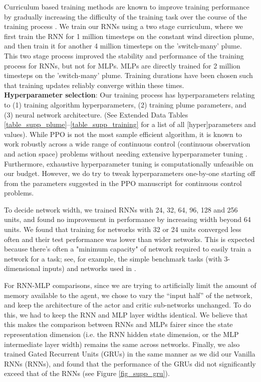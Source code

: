 \documentclass[5p,twocolumn,authoryear]{elsarticle}
\begin{document}
Curriculum based training methods are known to improve training performance by gradually increasing the difficulty of the training task over the course of the training process \citep{bengio2009curriculum}.
We train our RNNs using a two stage curriculum, where we first train the RNN for 1 million timesteps on the constant wind direction plume, and then train it for another 4 million timesteps on the 'switch-many' plume.
This two stage process improved the stability and performance of the training process for RNNs, but not for MLPs.
MLPs are directly trained for 2 million timesteps on the 'switch-many' plume. 
Training durations have been chosen such that training updates reliably converge within these times. \\

\textbf{Hyperparameter selection}:
Our training process has hyperparameters relating to (1) training algorithm hyperparameters, (2) training plume parameters, and (3) neural network architecture. 
(See Extended Data Tables \ref{table_supp_plume}--\ref{table_supp_training} for a list of all [hyper]parameters and values).
While PPO is not the most sample efficient algorithm, it is known to work robustly across a wide range of continuous control (continuous observation and action space) problems without needing extensive hyperparameter tuning \citep{schulman2017proximal,ni2021recurrent}.
Furthermore, exhaustive hyperparameter tuning is computationally unfeasible on our budget.
However, we do try to tweak hyperparameters one-by-one starting off from the parameters suggested in the PPO manuscript for continuous control problems.

To decide network width, we trained RNNs with 24, 32, 64, 96, 128 and 256 units, and found no improvement in performance by increasing width beyond 64 units. We found that training for networks with 32 or 24 units converged less often and their test performance was lower than wider networks. This is expected because there's often a "minimum capacity" of network required to easily train a network for a task; see, for example, the simple benchmark tasks (with 3-dimensional inputs) and networks used in \cite{maheswaranathan2019universality}.

For RNN-MLP comparisons, since we are trying to artificially limit the amount of memory available to the agent, we chose to vary the ``input half'' of the network, and keep the architecture of the actor and critic sub-networks unchanged. To do this, we had to keep the RNN and MLP layer widths identical. We believe that this makes the comparison between RNNs and MLPs fairer since the state representation dimension (i.e. the RNN hidden state dimension, or the MLP intermediate layer width) remains the same across networks.
Finally, we also trained Gated Recurrent Units (GRUs) in the same manner as we did our Vanilla RNNs (RNNs), and found that the performance of the GRUs did not significantly exceed that of the RNNs (see Figure \ref{fig_supp_gru}). 
\end{document}

